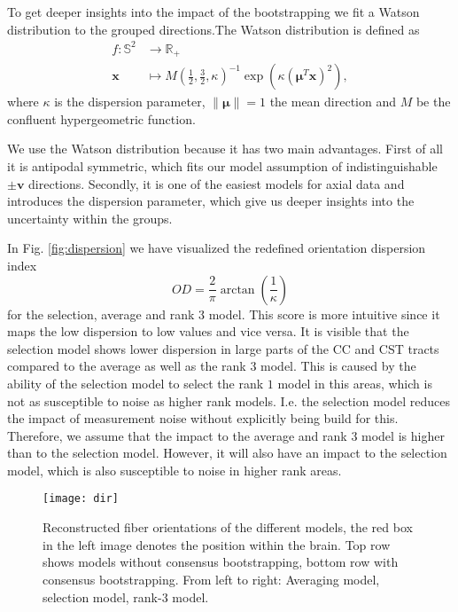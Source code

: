 To get deeper insights into the impact of the bootstrapping we fit a Watson
distribution to the grouped directions.The Watson distribution is defined as  
\begin{align*}
	f : \mathbb{S}^2 & \longrightarrow  \mathbb{R}_+ \\
	\mathbf{x} & \longmapsto  M \left( \frac{1}{2}, \frac{3}{2} , \kappa
	\right)^{-1} \exp \left(  \kappa
	\left( \mathbf{\mu}^T \mathbf{x} \right)^2 
	\right) 	,  
\end{align*}
where $\kappa$ is the dispersion parameter, $\| \mathbf{\mu} \| = 1$ the
mean direction and $M$ be the confluent hypergeometric function. 

We use the Watson distribution because it has two main advantages. First of all it is antipodal symmetric,
which fits our model assumption of indistinguishable $\pm \mathbf{v}$
directions. Secondly, it is one of the easiest models for axial data and
introduces the dispersion parameter, which give us deeper insights into the
uncertainty within the groups. 

In Fig. \ref{fig:dispersion} we have visualized the redefined orientation dispersion index
\cite{dispersionParameter}  
\[ OD = \frac{2}{\pi} \arctan \left( \frac{1}{\kappa} \right) \] 
for the selection, average and rank 3 model. This score is more intuitive since
it maps the low dispersion to low values and vice versa. It is visible that the
selection model shows lower dispersion in large parts of the CC and CST tracts
compared to the average as well as the rank $3$ model. This is caused by the
ability of the selection model to select the rank $1$ model in this areas, which
is not as susceptible to noise as higher rank models. I.e. the selection model
reduces the impact of measurement noise without explicitly being build for
this. 
Therefore, we assume that the impact to the average and rank $3$ model is higher
than to the selection model. However, it will also have an impact to the
selection model, which is also susceptible to noise in higher rank areas. 

\begin{figure*}[t]
	\centering
	\texttt{[image: dir]}
	\caption{Reconstructed fiber orientations of the different models, the
	red box in the left image denotes the position within the brain. Top row
shows models without consensus bootstrapping, bottom row with consensus
bootstrapping. From left to right: Averaging model, selection model, rank-$3$
model.}
	\label{fig:directions}
\end{figure*}

